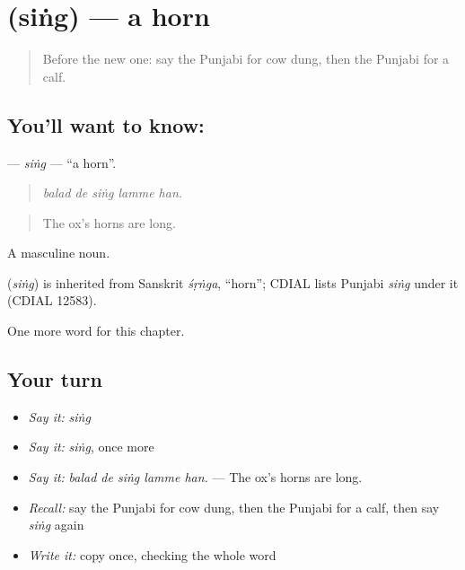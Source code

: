 \section[\texorpdfstring{\pa{ਸਿੰਗ} (siṅg)}{ਸਿੰਗ (siṅg)}]{ (siṅg) — a horn}

\label{lesson:PA-C308-sing}



\begin{quote}
Before the new one: say the Punjabi for cow dung, then the Punjabi for a calf.
\end{quote}

\subsection*{You'll want to know: }
\textbf{} — \emph{siṅg} — \textquotedblleft{}a horn\textquotedblright{}.

\begin{quote}
    
\end{quote}

\begin{quote}
\emph{balad de siṅg lamme han.}
\end{quote}

\begin{quote}
The ox's horns are long.
\end{quote}

A masculine noun.

\begin{cousinweb}
\textbf{} (\emph{siṅg}) is inherited from Sanskrit \emph{śṛṅga}, \textquotedblleft{}horn\textquotedblright{}; CDIAL lists Punjabi \emph{siṅg} under it (CDIAL 12583).
\end{cousinweb}

\begin{grammarlens}[title={What you've built}]
One more word for this chapter.
\end{grammarlens}

\subsection*{Your turn}
\begin{itemize}
\raggedright
  \item \emph{Say it:} \emph{siṅg}
  \item \emph{Say it:} \emph{siṅg}, once more
  \item \emph{Say it:} \emph{balad de siṅg lamme han.} — The ox's horns are long.
  \item \emph{Recall:} say the Punjabi for cow dung, then the Punjabi for a calf, then say \emph{siṅg} again
  \item \emph{Write it:} copy \textbf{} once, checking the whole word
\end{itemize}

